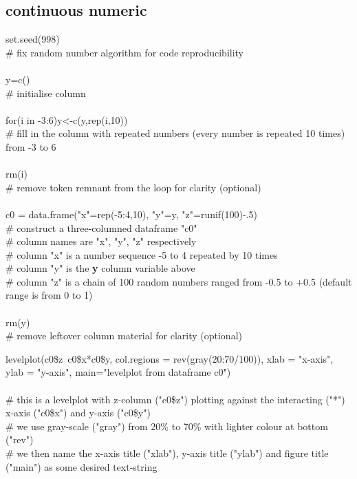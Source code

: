 \documentclass[../note.tex]{subfiles} %
\begin{document}
\subsection{continuous numeric}
\begin{code}
set.seed(998)\\
\# fix random number algorithm for code reproducibility\\\\
y=c()\\
\# initialise column\\\\
for(i in -3:6){y<-c(y,rep(i,10))}\\
\# fill in the column with repeated numbers (every number is repeated 10 times) from -3 to 6\\\\
rm(i)\\
\# remove token remnant from the loop for clarity (optional)\\\\
c0 = data.frame("x"=rep(-5:4,10), "y"=y, "z"=runif(100)-.5)\\
\# construct a three-columned dataframe "c0"\\
\# column names are "x", "y", "z" respectively\\
\# column "x" is a number sequence -5 to 4 repeated by 10 times\\
\# column "y" is the \textbf{y} column variable above\\
\# column "z" is a chain of 100 random numbers ranged from -0.5 to +0.5 (default range is from 0 to 1)\\\\
rm(y)\\
\# remove leftover column material for clarity (optional)
\end{code}

\begin{code}
levelplot(c0\$z~c0\$x*c0\$y, col.regions = rev(gray(20:70/100)), xlab = "x-axis", ylab = "y-axis", main="levelplot from dataframe c0")\\\\
\# this is a levelplot with z-column ("c0\$z") plotting against the interacting ("*") x-axis ("c0\$x") and y-axis ("c0\$y")\\
\# we use gray-scale ("gray") from 20\% to 70\% with lighter colour at bottom ("rev")\\
\# we then name the x-axis title ("xlab"), y-axis title ("ylab") and figure title ("main") as some desired text-string
\end{code}
\end{document}

